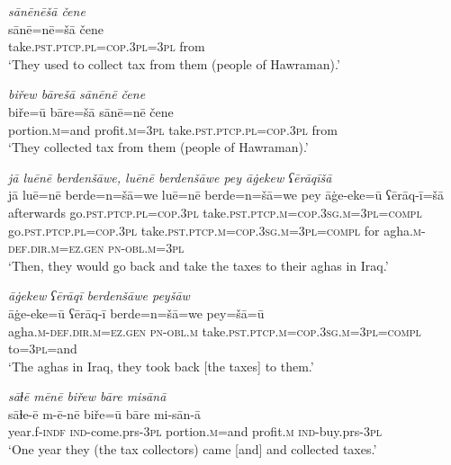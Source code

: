 \ea \label{BP.25}
\textit{sānēnēšā čene} \\ 
\gll sānē=nē=šā čene \\ 
 take\textsc{.pst}\textsc{.ptcp}\textsc{.pl}\textsc{=cop}\textsc{.3pl}\textsc{=3pl} from \\ 
\glt `They used to collect tax from them (people of Hawraman).'
\z 
 
\ea \label{BP.26}
\textit{biřew bārešā sānēnē čene} \\ 
\gll biře=ū bāre=šā sānē=nē čene \\ 
 portion\textsc{.m}=and profit\textsc{.m}\textsc{=3pl} take\textsc{.pst}\textsc{.ptcp}\textsc{.pl}\textsc{=cop}\textsc{.3pl} from \\ 
\glt `They collected tax from them (people of Hawraman).'
\z 
 
\ea \label{BP.27}
\textit{jā luēnē berdenšāwe, luēnē berdenšāwe pey āġekew ʕērāqīšā} \\ 
\gll jā luē=nē berde=n=šā=we luē=nē berde=n=šā=we pey āġe-eke=ū ʕērāq-ī=šā \\ 
 afterwards go\textsc{.pst}\textsc{.ptcp}\textsc{.pl}\textsc{=cop}\textsc{.3pl} take\textsc{.pst}\textsc{.ptcp}\textsc{.m}\textsc{=cop}\textsc{.3sg}\textsc{.m}\textsc{=3pl}\textsc{=compl} go\textsc{.pst}\textsc{.ptcp}\textsc{.pl}\textsc{=cop}\textsc{.3pl} take\textsc{.pst}\textsc{.ptcp}\textsc{.m}\textsc{=cop}\textsc{.3sg}\textsc{.m}\textsc{=3pl}\textsc{=compl} for agha\textsc{.m}\textsc{-def}\textsc{.dir}\textsc{.m}\textsc{=ez.gen} \textsc{pn}\textsc{-obl}\textsc{.m}\textsc{=3pl} \\ 
\glt `Then, they would go back and take the taxes to their aghas in Iraq.'
\z 
 
\ea \label{BP.28}
\textit{āġekew ʕērāqī berdenšāwe peyšāw} \\ 
\gll āġe-eke=ū ʕērāq-ī berde=n=šā=we pey=šā=ū \\ 
 agha\textsc{.m}\textsc{-def}\textsc{.dir}\textsc{.m}\textsc{=ez.gen} \textsc{pn}\textsc{-obl}\textsc{.m} take\textsc{.pst}\textsc{.ptcp}\textsc{.m}\textsc{=cop}\textsc{.3sg}\textsc{.m}\textsc{=3pl}\textsc{=compl} to\textsc{=3pl}=and \\ 
\glt `The aghas in Iraq, they took back [the taxes] to them.'
\z 
 
\ea \label{BP.29}
\textit{sāɫē mēnē biřew bāre misānā} \\ 
\gll sāɫe-ē m-ē-nē biře=ū bāre mi-sān-ā \\ 
 year.f\textsc{-indf} \textsc{ind-}come.prs\textsc{-3pl} portion\textsc{.m}=and profit\textsc{.m} \textsc{ind-}buy.prs\textsc{-3pl} \\ 
\glt `One year they (the tax collectors) came [and] and collected taxes.'
\z 
 
